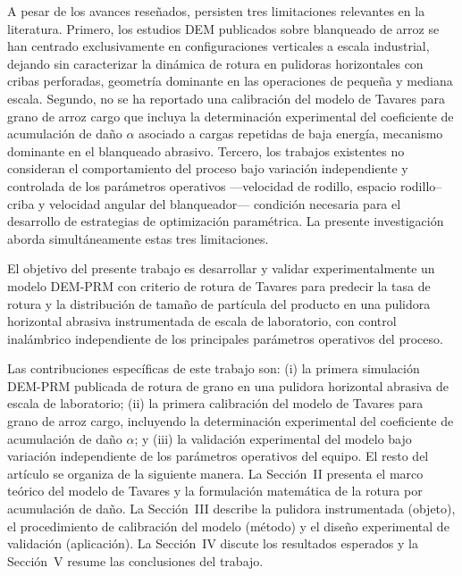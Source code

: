 \documentclass[conference]{IEEEtran}
\begin{document}
A pesar de los avances reseñados, persisten tres limitaciones relevantes en la literatura. Primero, los estudios DEM publicados sobre blanqueado de arroz se han centrado exclusivamente en configuraciones verticales a escala industrial, dejando sin caracterizar la dinámica de rotura en pulidoras horizontales con cribas perforadas, geometría dominante en las operaciones de pequeña y mediana escala. Segundo, no se ha reportado una calibración del modelo de Tavares para grano de arroz cargo que incluya la determinación experimental del coeficiente de acumulación de daño $\alpha$ asociado a cargas repetidas de baja energía, mecanismo dominante en el blanqueado abrasivo. Tercero, los trabajos existentes no consideran el comportamiento del proceso bajo variación independiente y controlada de los parámetros operativos —velocidad de rodillo, espacio rodillo--criba y velocidad angular del blanqueador— condición necesaria para el desarrollo de estrategias de optimización paramétrica. La presente investigación aborda simultáneamente estas tres limitaciones.

El objetivo del presente trabajo es desarrollar y validar experimentalmente un modelo DEM-PRM con criterio de rotura de Tavares para predecir la tasa de rotura y la distribución de tamaño de partícula del producto en una pulidora horizontal abrasiva instrumentada de escala de laboratorio, con control inalámbrico independiente de los principales parámetros operativos del proceso.

Las contribuciones específicas de este trabajo son: (i) la primera simulación DEM-PRM publicada de rotura de grano en una pulidora horizontal abrasiva de escala de laboratorio; (ii) la primera calibración del modelo de Tavares para grano de arroz cargo, incluyendo la determinación experimental del coeficiente de acumulación de daño $\alpha$; y (iii) la validación experimental del modelo bajo variación independiente de los parámetros operativos del equipo. El resto del artículo se organiza de la siguiente manera. La Sección~II presenta el marco teórico del modelo de Tavares y la formulación matemática de la rotura por acumulación de daño. La Sección~III describe la pulidora instrumentada (objeto), el procedimiento de calibración del modelo (método) y el diseño experimental de validación (aplicación). La Sección~IV discute los resultados esperados y la Sección~V resume las conclusiones del trabajo.
\end{document}
